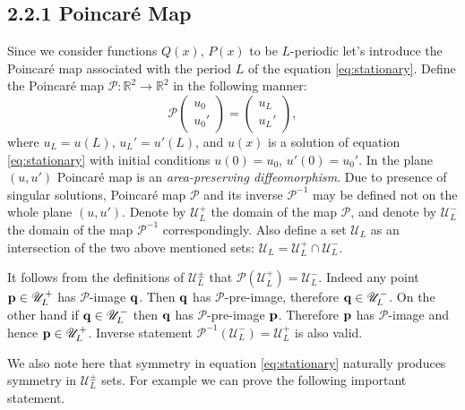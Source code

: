 \subsection*{2.2.1 Poincar\'e Map}

Since we consider functions $Q(x)$, $P(x)$ to be $L$-periodic let's introduce the Poincar\'e map associated with the period $L$ of the equation \eqref{eq:stationary}.
Define the Poincar\'e map $\mathcal{P}: \mathbb{R}^2 \to \mathbb{R}^2$ in the following manner:
\begin{equation}
	\mathcal{P} \begin{pmatrix} u_0 \\ u_0' \end{pmatrix}
	= \begin{pmatrix} u_L \\ u_L' \end{pmatrix},
\label{eq:poincare-map}
\end{equation}
where $u_L = u(L)$, $u_L' = u'(L)$, and $u(x)$ is a solution of equation \eqref{eq:stationary} with initial conditions $u(0) = u_0$, $u'(0) = u_0'$.
In the plane $(u, u')$ Poincar\'e map is an {\it area-preserving diffeomorphism}.
Due to presence of singular solutions, Poincar\'e map $\mathcal{P}$ and its inverse $\mathcal{P}^{-1}$ may be defined not on the whole plane $(u, u')$.
Denote by $\mathscr{U}_L^+$ the domain of the map $\mathcal{P}$, and denote by $\mathscr{U}_L^-$ the domain of the map $\mathcal{P}^{-1}$ correspondingly.
Also define a set $\mathscr{U}_L$ as an intersection of the two above mentioned sets: $\mathscr{U}_L = \mathscr{U}_L^+ \cap \mathscr{U}_L^-$.

It follows from the definitions of $\mathscr{U}_L^{\pm}$ that $\mathcal{P}(\mathscr{U}_L^+) = \mathscr{U}_L^-$.
Indeed any point $\vb{p} \in \mathscr{U}_L^+$ has $\mathcal{P}$-image $\vb{q}$.
Then $\vb{q}$ has $\mathcal{P}$-pre-image, therefore $\vb{q} \in \mathscr{U}_L^-$.
On the other hand if $\vb{q} \in \mathscr{U}_L^-$ then $\vb{q}$ has $\mathcal{P}$-pre-image $\vb{p}$.
Therefore $\vb{p}$ has $\mathcal{P}$-image and hence $\vb{p} \in \mathscr{U}_L^+$.
Inverse statement $\mathcal{P}^{-1}(\mathscr{U}_L^-) = \mathscr{U}_L^+$ is also valid.

We also note here that symmetry in equation \eqref{eq:stationary} naturally produces symmetry in $\mathscr{U}_L^{\pm}$ sets.
For example we can prove the following important statement.

